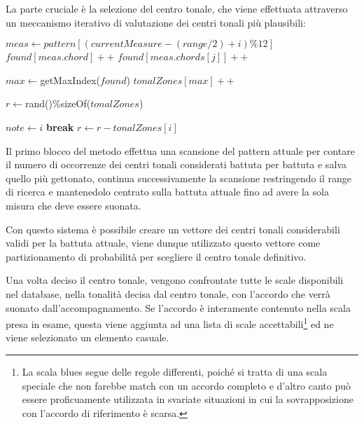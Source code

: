 La parte cruciale è la selezione del centro tonale, che viene effettuata attraverso un meccanismo iterativo di valutazione dei centri tonali più plausibili:

\begin{algorithm}
\caption{}
\label{algo-director-tzone}
\begin{algorithmic}[1]
			\State $meas \gets pattern[(currentMeasure - (range/2) + i) \% 12]$
				\State $found[meas.chord] ++$
			\Else
				 	\State $found[meas.chords[j]] ++$
				\EndFor
			\EndIf
		\EndFor
		
		\State $max \gets $getMaxIndex($found$)
		\State $tonalZones[max] ++$
		
	\EndFor
	
	\State $r \gets $rand()$ \% $sizeOf($tonalZones$)
	
				\State $note \gets i$
				\State \textbf{break}
			\Else
				\State $r \gets r - tonalZones[i]$
			\EndIf
		\EndIf
	\EndFor
\EndFunction
\end{algorithmic}
\end{algorithm}

Il primo blocco del metodo effettua una scansione del pattern attuale per contare il numero di occorrenze dei centri tonali considerati battuta per battuta e salva quello più gettonato, continua successivamente la scansione restringendo il range di ricerca e mantenedolo centrato sulla battuta attuale fino ad avere la sola misura che deve essere suonata.

Con questo sistema è possibile creare un vettore dei centri tonali considerabili validi per la battuta attuale, viene dunque utilizzato questo vettore come partizionamento di probabilità per scegliere il centro tonale definitivo.

Una volta deciso il centro tonale, vengono confrontate tutte le scale disponibili nel database, nella tonalità decisa dal centro tonale, con l'accordo che verrà suonato dall'accompagnamento. Se l'accordo è interamente contenuto nella scala presa in esame, questa viene aggiunta ad una lista di scale accettabili\footnote{La scala blues segue delle regole differenti, poiché si tratta di una scala speciale che non farebbe match con un accordo completo e d'altro canto può essere proficuamente utilizzata in svariate situazioni in cui la sovrapposizione con l'accordo di riferimento è scarsa.} ed ne viene selezionato un elemento casuale.

